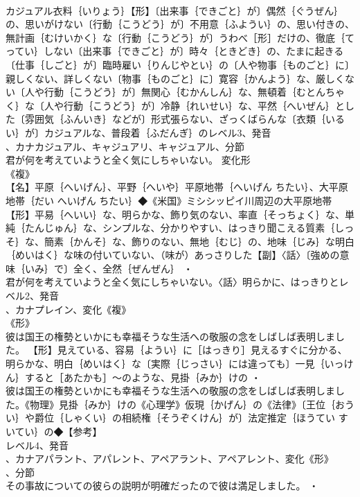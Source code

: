 \documentclass[8pt]{extreport}
\begin{document}
\begin{CJK}{UTF8}{min}
\\	カジュアル衣料｛いりょう｝【形】〔出来事｛できごと｝が〕偶然｛ぐうぜん｝の、思いがけない〔行動｛こうどう｝が〕不用意｛ふようい｝の、思い付きの、無計画｛むけいかく｝な〔行動｛こうどう｝が〕うわべ［形］だけの、徹底｛てってい｝しない〔出来事｛できごと｝が〕時々｛ときどき｝の、たまに起きる〔仕事｛しごと｝が〕臨時雇い｛りんじやとい｝の〔人や物事｛ものごと｝に〕親しくない、詳しくない〔物事｛ものごと｝に〕寛容｛かんよう｝な、厳しくない〔人や行動｛こうどう｝が〕無関心｛むかんしん｝な、無頓着｛むとんちゃく｝な〔人や行動｛こうどう｝が〕冷静｛れいせい｝な、平然｛へいぜん｝とした〔雰囲気｛ふんいき｝などが〕形式張らない、ざっくばらんな〔衣類｛いるい｝が〕カジュアルな、普段着｛ふだんぎ｝のレベル3、発音
\\	、カナカジュアル、キャジュアリ、キャジュアル、分節
\\	君が何を考えていようと全く気にしちゃいない。	変化形 
\\	《複》
\\	【名】平原｛へいげん｝、平野｛へいや｝平原地帯｛へいげん ちたい｝、大平原地帯｛だい へいげん ちたい｝◆《米国》ミシシッピイ川周辺の大平原地帯【形】平易｛へいい｝な、明らかな、飾り気のない、率直｛そっちょく｝な、単純｛たんじゅん｝な、シンプルな、分かりやすい、はっきり聞こえる質素｛しっそ｝な、簡素｛かんそ｝な、飾りのない、無地｛むじ｝の、地味｛じみ｝な明白｛めいはく｝な味の付いていない、（味が）あっさりした【副】〈話〉〔強めの意味｛いみ｝で〕全く、全然｛ぜんぜん｝ ・
\\	君が何を考えていようと全く気にしちゃいない。〈話〉明らかに、はっきりとレベル2、発音
\\	、カナプレイン、変化《複》
\\	《形》
\\	彼は国王の権勢といかにも幸福そうな生活への敬服の念をしばしば表明しました。		【形】見えている、容易｛ようい｝に［はっきり］見えるすぐに分かる、明らかな、明白｛めいはく｝な〔実際｛じっさい｝には違っても〕一見｛いっけん｝すると［あたかも］～のような、見掛｛みか｝けの ・
\\	彼は国王の権勢といかにも幸福そうな生活への敬服の念をしばしば表明しました。《物理》見掛｛みか｝けの《心理学》仮現｛かげん｝の《法律》〔王位｛おうい｝や爵位｛しゃくい｝の相続権｛そうぞくけん｝が〕法定推定｛ほうてい すいてい｝の◆【参考】
\\	レベル4、発音
\\	、カナアパラント、アパレント、アペアラント、アペアレント、変化《形》
\\	、分節
\\	その事故についての彼らの説明が明確だったので彼は満足しました。 ・

\end{CJK}
\end{document}
